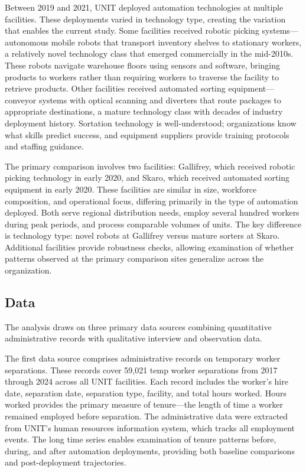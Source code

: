 \documentclass[12pt]{article}
\begin{document}
Between 2019 and 2021, UNIT deployed automation technologies at multiple facilities. These deployments varied in technology type, creating the variation that enables the current study. Some facilities received robotic picking systems---autonomous mobile robots that transport inventory shelves to stationary workers, a relatively novel technology class that emerged commercially in the mid-2010s. These robots navigate warehouse floors using sensors and software, bringing products to workers rather than requiring workers to traverse the facility to retrieve products. Other facilities received automated sorting equipment---conveyor systems with optical scanning and diverters that route packages to appropriate destinations, a mature technology class with decades of industry deployment history. Sortation technology is well-understood; organizations know what skills predict success, and equipment suppliers provide training protocols and staffing guidance.

The primary comparison involves two facilities: Gallifrey, which received robotic picking technology in early 2020, and Skaro, which received automated sorting equipment in early 2020. These facilities are similar in size, workforce composition, and operational focus, differing primarily in the type of automation deployed. Both serve regional distribution needs, employ several hundred workers during peak periods, and process comparable volumes of units. The key difference is technology type: novel robots at Gallifrey versus mature sorters at Skaro. Additional facilities provide robustness checks, allowing examination of whether patterns observed at the primary comparison sites generalize across the organization.

\subsection{Data}

The analysis draws on three primary data sources combining quantitative administrative records with qualitative interview and observation data.

The first data source comprises administrative records on temporary worker separations. These records cover 59,021 temp worker separations from 2017 through 2024 across all UNIT facilities. Each record includes the worker's hire date, separation date, separation type, facility, and total hours worked. Hours worked provides the primary measure of tenure---the length of time a worker remained employed before separation. The administrative data were extracted from UNIT's human resources information system, which tracks all employment events. The long time series enables examination of tenure patterns before, during, and after automation deployments, providing both baseline comparisons and post-deployment trajectories.
\end{document}
